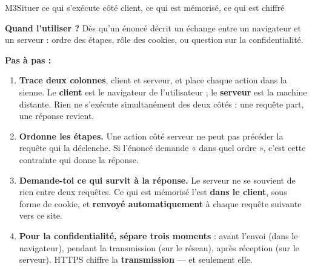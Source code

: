 \begin{fichemethode}{M3}{Situer ce qui s'exécute côté client, ce qui est mémorisé, ce qui est chiffré}

\textbf{Quand l'utiliser ?} Dès qu'un énoncé décrit un échange entre un navigateur et un
serveur : ordre des étapes, rôle des cookies, ou question sur la confidentialité.

\textbf{Pas à pas :}
\begin{enumerate}
  \item \textbf{Trace deux colonnes}, client et serveur, et place chaque action dans la sienne.
        Le \textbf{client} est le navigateur de l'utilisateur ; le \textbf{serveur} est la
        machine distante. Rien ne s'exécute simultanément des deux côtés : une requête part,
        une réponse revient.
  \item \textbf{Ordonne les étapes.} Une action côté serveur ne peut pas précéder la requête
        qui la déclenche. Si l'énoncé demande « dans quel ordre », c'est cette contrainte qui
        donne la réponse.
  \item \textbf{Demande-toi ce qui survit à la réponse.} Le serveur ne se souvient de rien
        entre deux requêtes. Ce qui est mémorisé l'est \textbf{dans le client}, sous forme de
        cookie, et \textbf{renvoyé automatiquement} à chaque requête suivante vers ce site.
  \item \textbf{Pour la confidentialité, sépare trois moments} : avant l'envoi (dans le
        navigateur), pendant la transmission (sur le réseau), après réception (sur le serveur).
        HTTPS chiffre la \textbf{transmission} — et seulement elle.
\end{enumerate}


\end{fichemethode}
